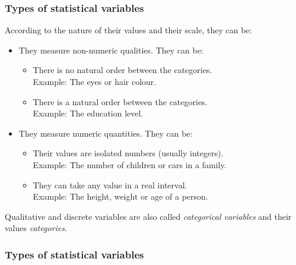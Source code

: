 \begin{frame}
\frametitle{Types of statistical variables}
According to the nature of their values and their scale, they can be:
\begin{itemize}
\item {} They measure non-numeric qualities. 
They can be:
\begin{itemize}
\item {} There is no natural order between the categories.\\
Example: The eyes or hair colour. 
\item {} There is a natural order between the categories. \\
Example: The education level.
\end{itemize}
\item {} They measure numeric quantities. 
They can be:
\begin{itemize}
\item {} Their values are isolated numbers (usually integers).\\
Example: The number of children or cars in a family.
\item {} They can take any value in a real interval.\\
Example: The height, weight or age of a person. 
\end{itemize}
\end{itemize}
Qualitative and discrete variables are also called \emph{categorical variables} and their values \emph{categories}.
\end{frame}


\begin{frame}
\frametitle{Types of statistical variables}
\begin{center}

\end{center}
\end{frame}



